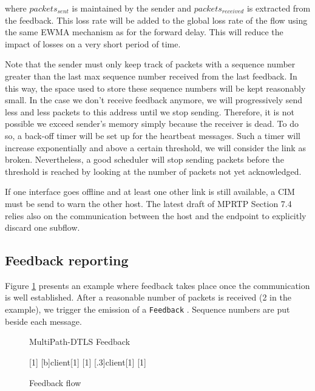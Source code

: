 where $packets_{sent}$ is maintained by the sender and $packets_{received}$ is extracted from the feedback. This loss rate will be added to the global loss rate of the flow using the same EWMA mechanism as for the forward delay. This will reduce the impact of losses on a very short period of time.

Note that the sender must only keep track of packets with a sequence number greater than the last max sequence number received from the last feedback. In this way, the space used to store these sequence numbers will be kept reasonably small. In the case we don't receive feedback anymore, we will progressively send less and less packets to this address until we stop sending. Therefore, it is not possible we exceed sender's memory simply because the receiver is dead. To do so, a back-off timer will be set up for the heartbeat messages. Such a timer will increase exponentially and above a certain threshold, we will consider the link as broken. Nevertheless, a good scheduler will stop sending packets before the threshold is reached by looking at the number of packets not yet acknowledged. 

If one interface goes offline and at least one other link is still available, a CIM must be send to warn the other host. The latest draft of MPRTP \cite{singh-avtcore-mprtp} Section 7.4 relies also on the communication between the host and the endpoint to explicitly discard one subflow.


\subsection{Feedback reporting}
\label{sec:feedbackReport}


Figure \ref{fig:feedback} presents an example where feedback takes place once the communication is well established. After a reasonable number of packets is received (2 in the example), we trigger the emission of a \texttt{Feedback} . Sequence numbers are put beside each message.


\begin{figure}[!h]
\centering
\begin{msc}[r]{MultiPath-DTLS Feedback}

\setlength{\instfootheight}{0em}
\setlength{\instheadheight}{0em}
\setlength{\instdist}{0.5\linewidth}
\setlength{\levelheight}{3em}


[1]
\nextlevel
{}[b]{}{client}[1]
\nextlevel
{}[1]
\nextlevel
{}[.3]{client}[1]
\nextlevel
{}[1]
\nextlevel

\end{msc}
\caption{Feedback flow}
\label{fig:feedback}
\end{figure}

